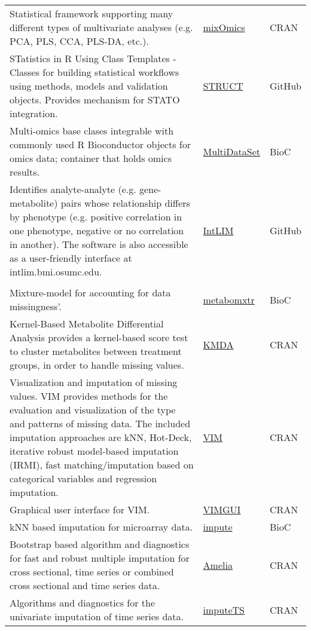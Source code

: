 \documentclass[]{article}
\begin{document}
\begin{longtable}{>{\raggedright\arraybackslash}p{30em}>{\raggedright\arraybackslash}p{10em}>{\raggedright\arraybackslash}p{3em}}
\rowcolor{gray!6}  Statistical framework supporting many different types of multivariate analyses (e.g. PCA, PLS, CCA, PLS-DA, etc.). & \href{https://cran.r-project.org/web/packages/mixOmics/index.html}{mixOmics} & CRAN\\
STatistics in R Using Class Templates - Classes for building statistical workflows using methods, models and validation objects. Provides mechanism for STATO integration. & \href{http://www.github.com/computational-metabolomics/struct}{STRUCT} & GitHub\\
\rowcolor{gray!6}  Multi-omics base clases integrable with commonly used R Bioconductor objects for omics data; container that holds omics results. & \href{NA}{MultiDataSet} & BioC\\
Identifies analyte-analyte (e.g. gene-metabolite) pairs whose relationship differs by phenotype (e.g. positive correlation in one phenotype, negative or no correlation in another). The software is also accessible as a user-friendly interface at intlim.bmi.osumc.edu. & \href{https://github.com/mathelab/IntLIM}{IntLIM} & GitHub\\
\rowcolor{gray!6}  \addlinespace[0.3em]
\multicolumn{3}{l}{\textbf{Missing value imputation}}\\
Mixture-model for accounting for data missingness'. & \href{NA}{metabomxtr} & BioC\\
Kernel-Based Metabolite Differential Analysis provides a kernel-based score test to cluster metabolites between treatment groups, in order to handle missing values. & \href{NA}{KMDA} & CRAN\\
\rowcolor{gray!6}  Visualization and imputation of missing values. VIM provides methods for the evaluation and visualization of the type and patterns of missing data. The included imputation approaches are kNN, Hot-Deck, iterative robust model-based imputation (IRMI), fast matching/imputation based on categorical variables and regression imputation. & \href{NA}{VIM} & CRAN\\
Graphical user interface for VIM. & \href{NA}{VIMGUI} & CRAN\\
\rowcolor{gray!6}  kNN based imputation for microarray data. & \href{NA}{impute} & BioC\\
Bootstrap based algorithm and diagnostics for fast and robust multiple imputation for cross sectional, time series or combined cross sectional and time series data. & \href{NA}{Amelia} & CRAN\\
\rowcolor{gray!6}  Algorithms and diagnostics for the univariate imputation of time series data. & \href{NA}{imputeTS} & CRAN\\

\end{longtable}
\end{document}
